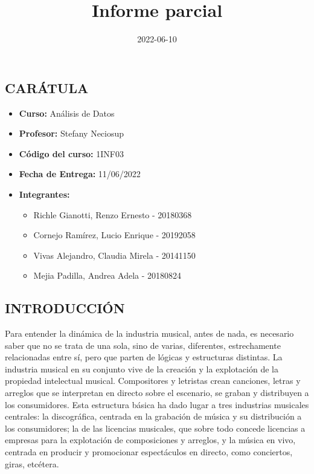 \documentclass[
  letterpaper,
  DIV=11,
  numbers=noendperiod]{scrartcl}
\title{Informe parcial}
\author{}
\date{2022-06-10}
\providecommand{\tightlist}{%
  \setlength{\itemsep}{0pt}\setlength{\parskip}{0pt}}
\renewcommand*\contentsname{Table of contents}
\begin{document}
\maketitle

\renewcommand*\contentsname{Table of contents}
{
\hypersetup{linkcolor=}
\setcounter{tocdepth}{4}
\tableofcontents
}
\hypertarget{caruxe1tula}{%
\subsection{CARÁTULA}\label{caruxe1tula}}

\begin{itemize}
\item
  \textbf{Curso:} Análisis de Datos
\item
  \textbf{Profesor:} Stefany Neciosup
\item
  \textbf{Código del curso:} 1INF03
\item
  \textbf{Fecha de Entrega:} 11/06/2022
\item
  \textbf{Integrantes:}

  \begin{itemize}
  \tightlist
  \item
    Richle Gianotti, Renzo Ernesto - 20180368
  \item
    Cornejo Ramírez, Lucio Enrique - 20192058
  \item
    Vivas Alejandro, Claudia Mirela - 20141150
  \item
    Mejia Padilla, Andrea Adela - 20180824
  \end{itemize}
\end{itemize}

\hypertarget{introducciuxf3n}{%
\subsection{INTRODUCCIÓN}\label{introducciuxf3n}}

Para entender la dinámica de la industria musical, antes de nada, es
necesario saber que no se trata de una sola, sino de varias, diferentes,
estrechamente relacionadas entre sí, pero que parten de lógicas y
estructuras distintas. La industria musical en su conjunto vive de la
creación y la explotación de la propiedad intelectual musical.
Compositores y letristas crean canciones, letras y arreglos que se
interpretan en directo sobre el escenario, se graban y distribuyen a los
consumidores. Esta estructura básica ha dado lugar a tres industrias
musicales centrales: la discográfica, centrada en la grabación de música
y su distribución a los consumidores; la de las licencias musicales, que
sobre todo concede licencias a empresas para la explotación de
composiciones y arreglos, y la música en vivo, centrada en producir y
promocionar espectáculos en directo, como conciertos, giras, etcétera.
\end{document}
